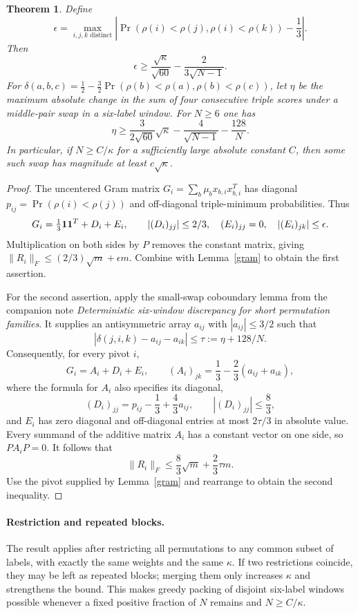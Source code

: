 \documentclass[11pt]{article}
\newtheorem{theorem}{Theorem}
\begin{document}
\begin{theorem}\label{main}
Define
\[
 \epsilon=\max_{i,j,k\text{ distinct}}
  \left|\Pr(\rho(i)<\rho(j),\rho(i)<\rho(k))-\frac13\right|.
\]
Then
\[
 \epsilon\ge\frac{\sqrt\kappa}{\sqrt{60}}
                   -\frac2{3\sqrt{N-1}}.
\]
For $\delta(a,b,c)=\frac12-\frac32\Pr(\rho(b)<\rho(a),\rho(b)<\rho(c))$,
let $\eta$ be the maximum absolute change in the sum of four consecutive
triple scores under a middle-pair swap in a six-label window. For
$N\ge6$ one has
\[
 \eta\ge\frac3{2\sqrt{60}}\sqrt\kappa
                 -\frac4{\sqrt{N-1}}-\frac{128}{N}.
\]
In particular, if $N\ge C/\kappa$ for a sufficiently large absolute
constant $C$, then some such swap has magnitude at least
$c\sqrt\kappa$.
\end{theorem}
\begin{proof}
The uncentered Gram matrix $G_i=\sum_b\mu_bx_{b,i}x_{b,i}^T$ has
diagonal $p_{ij}=\Pr(\rho(i)<\rho(j))$ and off-diagonal triple-minimum
probabilities. Thus
\[
 G_i=\tfrac13{\bf1}{\bf1}^{T}+D_i+E_i,
 \qquad |(D_i)_{jj}|\le2/3,\quad
 (E_i)_{jj}=0,\quad |(E_i)_{jk}|\le\epsilon.
\]
Multiplication on both sides by $P$ removes the constant matrix, giving
$\|R_i\|_F\le(2/3)\sqrt m+\epsilon m$. Combine with
Lemma~\ref{gram} to obtain the first assertion.

For the second assertion, apply the small-swap coboundary lemma from
the companion note \emph{Deterministic six-window discrepancy for short
permutation families}. It supplies an antisymmetric array $a_{ij}$
with $|a_{ij}|\le3/2$ such that
\[
 |\delta(j,i,k)-a_{ij}-a_{ik}|\le\tau:=\eta+128/N.
\]
Consequently, for every pivot $i$,
\[
 G_i=A_i+D_i+E_i,\qquad
 (A_i)_{jk}=\frac13-\frac23(a_{ij}+a_{ik}),
\]
where the formula for $A_i$ also specifies its diagonal,
\[
 (D_i)_{jj}=p_{ij}-\frac13+\frac43a_{ij},\qquad
 |(D_i)_{jj}|\le\frac83,
\]
and $E_i$ has zero diagonal and off-diagonal entries at most
$2\tau/3$ in absolute value. Every summand of the additive matrix
$A_i$ has a constant vector on one side, so $PA_iP=0$. It follows that
\[
 \|R_i\|_F\le\frac83\sqrt m+\frac23\tau m.
\]
Use the pivot supplied by Lemma~\ref{gram} and rearrange to obtain the
second inequality.
\end{proof}

\paragraph{Restriction and repeated blocks.}
The result applies after restricting all permutations to any common
subset of labels, with exactly the same weights and the same
$\kappa$. If two restrictions coincide, they may be left as repeated
blocks; merging them only increases $\kappa$ and strengthens the bound.
This makes greedy packing of disjoint six-label windows possible
whenever a fixed positive fraction of $N$ remains and
$N\ge C/\kappa$.
\end{document}
